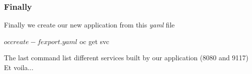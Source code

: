 \begin{frame}[fragile]
  \frametitle{Finally}
  Finally we create our new application from this \emph{yaml} file
  \begin{bashcode}
    $ oc create -f export.yaml
    $ oc get svc
  \end{bashcode}
  The last command list different services built by our application (8080 and 9117)\\
  Et voila...
\end{frame}
